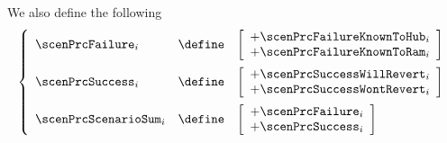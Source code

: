 We also define the following
\[
	\left\{ \begin{array}{lcl}
		\scenPrcFailure _{i} & \define &
		\left[ \begin{array}{l}
			+ \scenPrcFailureKnownToHub  _{i} \\
			+ \scenPrcFailureKnownToRam  _{i} \\
		\end{array} \right] \vspace{2mm} \\
		\scenPrcSuccess _{i} & \define &
		\left[ \begin{array}{l}
			+ \scenPrcSuccessWillRevert  _{i} \\
			+ \scenPrcSuccessWontRevert  _{i} \\
		\end{array} \right] \vspace{2mm} \\
		\scenPrcScenarioSum _{i} & \define & 
		\left[ \begin{array}{l}
			+ \scenPrcFailure  _{i} \\
			+ \scenPrcSuccess  _{i} \\
		\end{array} \right]
	\end{array} \right.
\]
